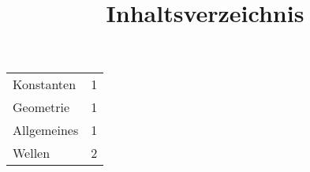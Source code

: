 
\title{Inhaltsverzeichnis}
\begin{tabular}{L{5cm} c}
	Konstanten & 1\\
	Geometrie & 1\\
	Allgemeines & 1\\
	Wellen&2\\
\end{tabular}
\newpage